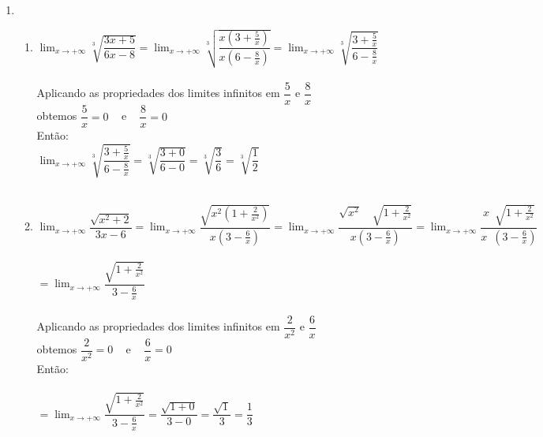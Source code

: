 \documentclass[a4paper, 12pt]{article}
\begin{document}
\begin{enumerate}
\item \begin{enumerate}
	\item $\displaystyle{\lim_{x\to+\infty} \sqrt[3]{\dfrac{3x + 5}{6x - 8}}} = \displaystyle{\lim_{x\to+\infty} \sqrt[3]{\dfrac{x(3 +\frac{5}{x})}{x(6 - \frac{8}{x})}}} = 		\displaystyle{\lim_{x\to+\infty} \sqrt[3]{\dfrac{3 +\frac{5}{x}}{6 - \frac{8}{x}}}}$ \\ \\
	
	Aplicando as propriedades dos limites infinitos em $\dfrac{5}{x}$ e $\dfrac{8}{x}$\\ obtemos  $\dfrac{5}{x} = 0$ \,\,\, e \,\,\, $\dfrac{8}{x} = 0$ \\ 

	Então:\\

	$\displaystyle{\lim_{x\to+\infty} \sqrt[3]{\dfrac{3 +\frac{5}{x}}{6 - \frac{8}{x}}}} = \displaystyle{\sqrt[3]{\dfrac{3 + 0}{6 - 0}}} = \displaystyle{\sqrt[3]{\dfrac{3}		{6}}} = \displaystyle{\sqrt[3]{\dfrac{1}{2}}}$ \\ \\
	
	\item $\displaystyle{\lim_{x\to+\infty} \dfrac{\sqrt{x^2 + 2}}{3x -6}} = \displaystyle{\lim_{x\to+\infty} \dfrac{\sqrt{x^2(1 + \frac{2}{x^2})}}{x(3 - \frac{6}{x})}} =  \displaystyle{\lim_{x\to+\infty} \dfrac{\sqrt{x^2} \,\,\,\,\,\, \sqrt{1 + \frac{2}{x^2}}}{x(3 - \frac{6}{x})}} =  \displaystyle{\lim_{x\to+\infty} \dfrac{x \,\,\, \sqrt{1 + \frac{2}{x^2}}}{x \,\,\, (3 - \frac{6}{x})}}$\\ \\

$= \displaystyle{\lim_{x\to+\infty} \dfrac{\sqrt{1 + \frac{2}{x^2}}}{3 - \frac{6}{x}}}$ \\ \\
	 
	 	
	Aplicando as propriedades dos limites infinitos em $\dfrac{2}{x^2}$ e $\dfrac{6}{x}$\\ obtemos  $\dfrac{2}{x^2} = 0$ \,\,\, e \,\,\, $\dfrac{6}{x} = 0$ \\ 

	Então:\\ \\
	
		 $= \displaystyle{\lim_{x\to+\infty} \dfrac{\sqrt{1 + \frac{2}{x^2}}}{3 - \frac{6}{x}}} = \displaystyle{\dfrac{\sqrt{1 + 0}}{3 - 0}} = \displaystyle{\dfrac{\sqrt{1}}{3}} = \displaystyle{\dfrac{1}{3}}$
	
	

	


	

\end{enumerate}
	
	 
\end{enumerate}

 
\end{document}
